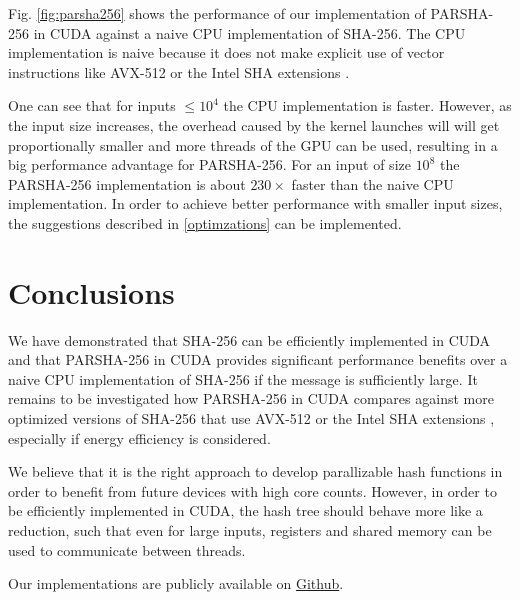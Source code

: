 \documentclass[letterpaper]{article}
\begin{document}
Fig. \ref{fig:parsha256} shows the performance of our implementation of PARSHA-256 in CUDA against a naive CPU implementation of SHA-256.
The CPU implementation is naive because it does not make explicit use of vector instructions like AVX-512 \cite{avx512} or the Intel SHA extensions \cite{SHA_Extensions}.

 
One can see that for inputs $\leq  10^4$ the CPU implementation is faster. However, as the input size increases, the overhead caused by the kernel launches will will get proportionally smaller and more threads of the GPU can be used, resulting in a big performance advantage for PARSHA-256.
For an input of size $10^8$ the PARSHA-256 implementation is about $230 \times$ faster than the naive CPU implementation.
In order to achieve better performance with smaller input sizes, the suggestions described in \ref{optimzations} can be implemented.






\section{Conclusions}
We have demonstrated that SHA-256 can be efficiently implemented in CUDA and that PARSHA-256 in CUDA provides significant performance benefits over a naive CPU implementation of SHA-256 if the message is sufficiently large.
It remains to be investigated how PARSHA-256 in CUDA compares against more optimized versions of SHA-256 that use AVX-512 \cite{avx512} or the Intel SHA extensions \cite{SHA_Extensions}, especially if energy efficiency is considered.

We believe that it is the right approach to develop parallizable hash functions in order to benefit from future devices with high core counts.
However, in order to be efficiently implemented in CUDA, the hash tree should behave more like a reduction, such that even for large inputs, registers and shared memory can be used to communicate between threads.

Our implementations are publicly available on \href{ https://github.com/Walon1998/Fast-Hashing-in-CUDA}{Github}.




\end{document}
